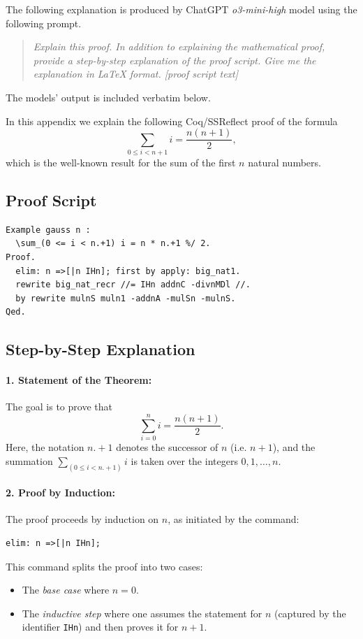 \documentclass[10pt,nonacm,natbib=false]{acmart}
\begin{document}
The following explanation is produced by ChatGPT \textit{o3-mini-high}
model using the following prompt.

\begin{quotation}
  \textit{Explain this proof. In addition to explaining the
    mathematical proof, provide a step-by-step explanation of the
    proof script. Give me the explanation in LaTeX format. [proof script text]}

\end{quotation}

\noindent The models' output is included verbatim below.

\noindent\hdashrule[0.5ex]{\textwidth}{1pt}{1pt}

In this appendix we explain the following Coq/SSReflect proof of the formula
\[
\sum_{0 \le i < n+1} i = \frac{n(n+1)}{2},
\]
which is the well-known result for the sum of the first \( n \) natural numbers.

\subsection*{Proof Script}
\begin{lstlisting}
Example gauss n :
  \sum_(0 <= i < n.+1) i = n * n.+1 %/ 2.
Proof.
  elim: n =>[|n IHn]; first by apply: big_nat1.
  rewrite big_nat_recr //= IHn addnC -divnMDl //.
  by rewrite mulnS muln1 -addnA -mulSn -mulnS.
Qed.
\end{lstlisting}

\subsection*{Step-by-Step Explanation}

\paragraph{1. Statement of the Theorem:}
The goal is to prove that
\[
\sum_{i=0}^{n} i = \frac{n(n+1)}{2}.  
\]
Here, the notation \( n.+1 \) denotes the successor of \( n \) (i.e. \( n+1 \)), and the summation \(\sum_(0 \le i < n.+1) i\) is taken over the integers \( 0, 1, \dots, n \).

\paragraph{2. Proof by Induction:} 
The proof proceeds by induction on \( n \), as initiated by the command:
\begin{verbatim}
elim: n =>[|n IHn];
\end{verbatim}
This command splits the proof into two cases:
\begin{itemize}
    \item The \emph{base case} where \( n = 0 \).
    \item The \emph{inductive step} where one assumes the statement for \( n \) (captured by the identifier \verb|IHn|) and then proves it for \( n+1 \).
\end{itemize}
\end{document}
